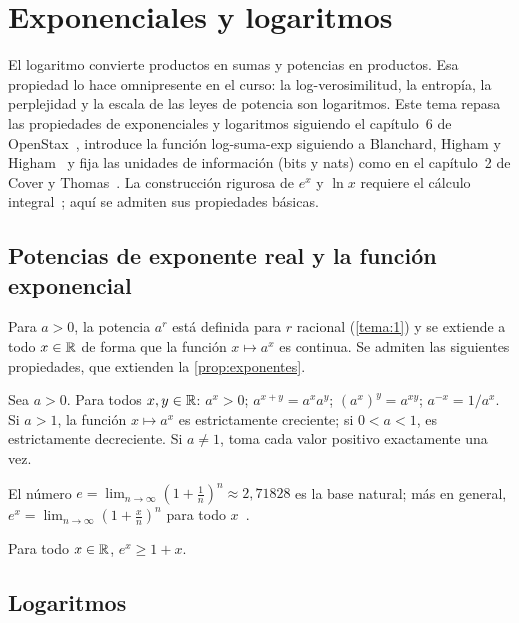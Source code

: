 \chapter{Exponenciales y logaritmos}
\label{tema:5}

El logaritmo convierte productos en sumas y potencias en productos. Esa propiedad lo hace omnipresente en el curso: la log-verosimilitud, la entropía, la perplejidad y la escala de las leyes de potencia son logaritmos. Este tema repasa las propiedades de exponenciales y logaritmos siguiendo el capítulo~6 de OpenStax~\cite{openstax}, introduce la función log-suma-exp siguiendo a Blanchard, Higham y Higham~\cite{blanchard} y fija las unidades de información (bits y nats) como en el capítulo~2 de Cover y Thomas~\cite{ct}. La construcción rigurosa de $e^x$ y $\ln x$ requiere el cálculo integral~\cite[cap.~18]{spivak}; aquí se admiten sus propiedades básicas.

\section{Potencias de exponente real y la función exponencial}

Para $a>0$, la potencia $a^r$ está definida para $r$ racional (\cref{tema:1}) y se extiende a todo $x\in\mathbb{R}$ de forma que la función $x\mapsto a^x$ es continua. Se admiten las siguientes propiedades, que extienden la \cref{prop:exponentes}.

\begin{proposicion}\label{prop:exp}
Sea $a>0$. Para todos $x,y\in\mathbb{R}$: $a^x>0$; $a^{x+y}=a^xa^y$; $(a^x)^y=a^{xy}$; $a^{-x}=1/a^x$. Si $a>1$, la función $x\mapsto a^x$ es estrictamente creciente; si $0<a<1$, es estrictamente decreciente. Si $a\neq1$, toma cada valor positivo exactamente una vez.
\end{proposicion}

El número $e=\lim_{n\to\infty}(1+\frac1n)^n\approx2{,}71828$ es la base natural; más en general, $e^x=\lim_{n\to\infty}(1+\frac xn)^n$ para todo $x$~\cite[cap.~18]{spivak}.

\begin{proposicion}\label{prop:ex-cota}
Para todo $x\in\mathbb{R}$, $e^x\ge1+x$.
\end{proposicion}

\section{Logaritmos}

